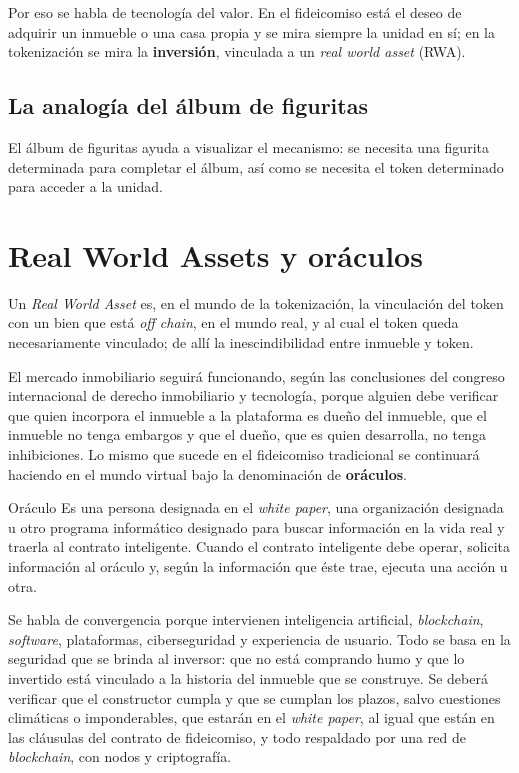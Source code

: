 \documentclass[12pt,oneside]{book}
\begin{document}
Por eso se habla de tecnología del valor. En el fideicomiso está el deseo de adquirir un inmueble o una casa propia y se mira siempre la unidad en sí; en la tokenización se mira la \textbf{inversión}, vinculada a un \textit{real world asset} (RWA).

\subsection{La analogía del álbum de figuritas}

El álbum de figuritas ayuda a visualizar el mecanismo: se necesita una figurita determinada para completar el álbum, así como se necesita el token determinado para acceder a la unidad.

\section{Real World Assets y oráculos}

Un \textit{Real World Asset} es, en el mundo de la tokenización, la vinculación del token con un bien que está \textit{off chain}, en el mundo real, y al cual el token queda necesariamente vinculado; de allí la inescindibilidad entre inmueble y token.

El mercado inmobiliario seguirá funcionando, según las conclusiones del congreso internacional de derecho inmobiliario y tecnología, porque alguien debe verificar que quien incorpora el inmueble a la plataforma es dueño del inmueble, que el inmueble no tenga embargos y que el dueño, que es quien desarrolla, no tenga inhibiciones. Lo mismo que sucede en el fideicomiso tradicional se continuará haciendo en el mundo virtual bajo la denominación de \textbf{oráculos}.

\begin{definition}{Oráculo}
Es una persona designada en el \textit{white paper}, una organización designada u otro programa informático designado para buscar información en la vida real y traerla al contrato inteligente. Cuando el contrato inteligente debe operar, solicita información al oráculo y, según la información que éste trae, ejecuta una acción u otra.
\end{definition}

Se habla de convergencia porque intervienen inteligencia artificial, \textit{blockchain}, \textit{software}, plataformas, ciberseguridad y experiencia de usuario. Todo se basa en la seguridad que se brinda al inversor: que no está comprando humo y que lo invertido está vinculado a la historia del inmueble que se construye. Se deberá verificar que el constructor cumpla y que se cumplan los plazos, salvo cuestiones climáticas o imponderables, que estarán en el \textit{white paper}, al igual que están en las cláusulas del contrato de fideicomiso, y todo respaldado por una red de \textit{blockchain}, con nodos y criptografía.
\end{document}
